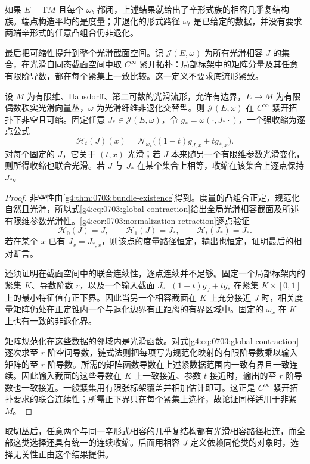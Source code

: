 如果 \(E=\mathrm{T}M\) 且每个 \(\omega_b\) 都闭，上述结果就给出了辛形式族的相容几乎复结构族。端点构造平均的是度量；非退化的形式路径 \(\omega_t\) 是已给定的数据，并没有要求两端辛形式的任意凸组合仍非退化。

\ProseParagraphBreak

最后把可缩性提升到整个光滑截面空间。记 \(\mathcal J(E,\omega)\) 为所有光滑相容 \(J\) 的集合，在光滑自同态截面空间中取 \(C^\infty\) 紧开拓扑：局部标架中的矩阵分量及其任意有限阶导数，都在每个紧集上一致比较。这一定义不要求底流形紧致。

\begin{theorem}\label{g4:thm:0703:global-contractibility}
	设 \(M\) 为有限维、Hausdorff、第二可数的光滑流形，允许有边界，\(E\to M\) 为有限偶数秩实光滑向量丛，\(\omega\) 为光滑纤维非退化交替型。则 \(\mathcal J(E,\omega)\) 在 \(C^\infty\) 紧开拓扑下非空且可缩。固定任意 \(J_*\in\mathcal J(E,\omega)\)，令 \(g_* =\omega(\cdot,J_*\cdot)\)，一个强收缩为逐点公式
	\begin{equation}\label{g4:eq:0703:global-contraction}
		\mathcal H_t(J)(x)
		=\mathcal N_{\omega_x}\bigl((1-t)g_{J,x}+t g_{*,x}\bigr).
	\end{equation}
	对每个固定的 \(J\)，它关于 \((t,x)\) 光滑；若 \(J\) 本来随另一个有限维参数光滑变化，则所得收缩也联合光滑。若 \(J\) 与 \(J_*\) 在某个集合上相等，收缩在该集合上逐点保持 \(J_*\)。
\end{theorem}
\begin{proof}
	非空性由\cref{g4:thm:0703:bundle-existence}得到。度量的凸组合正定，规范化自然且光滑，所以式\eqref{g4:eq:0703:global-contraction}给出全局光滑相容截面及所述有限维参数光滑性。\cref{g4:cor:0703:normalization-retraction}逐点验证
	\[
		\mathcal H_0(J)=J,\qquad
		\mathcal H_1(J)=J_*,\qquad
		\mathcal H_t(J_*)=J_*.
	\]
	若在某个 \(x\) 已有 \(J_x=J_{*,x}\)，则该点的度量路径恒定，输出也恒定，证明最后的相对断言。

	还须证明在截面空间中的联合连续性，逐点连续并不足够。固定一个局部标架内的紧集 \(K\)、导数阶数 \(r\)，以及一个输入截面 \(J\)。\((1-t)g_J+t g_*\) 在紧集 \(K\times[0,1]\) 上的最小特征值有正下界。因此当另一个相容截面在 \(K\) 上充分接近 \(J\) 时，相关度量矩阵仍处在正定锥内一个与退化边界有正距离的有界区域中。固定的 \(\omega_x\) 在 \(K\) 上也有一致的非退化界。

	矩阵规范化在这些数据的邻域内是光滑函数。对式\eqref{g4:eq:0703:global-contraction}逐次求至 \(r\) 阶空间导数，链式法则把每项写为规范化映射的有限阶导数乘以输入矩阵的至 \(r\) 阶导数。所需的矩阵函数导数在上述紧数据范围内一致有界且一致连续。因此输入截面的这些导数在 \(K\) 上一致接近、参数 \(t\) 接近时，输出的至 \(r\) 阶导数也一致接近。一般紧集用有限张标架覆盖并相加估计即可。这正是 \(C^\infty\) 紧开拓扑要求的联合连续性；所需正下界只在每个紧集上选择，故论证同样适用于非紧 \(M\)。
\end{proof}

取切丛后，任意两个与同一辛形式相容的几乎复结构都有光滑相容路径相连，而全部这类选择还具有统一的连续收缩。后面用相容 \(J\) 定义依赖同伦类的对象时，选择无关性正由这个结果提供。

